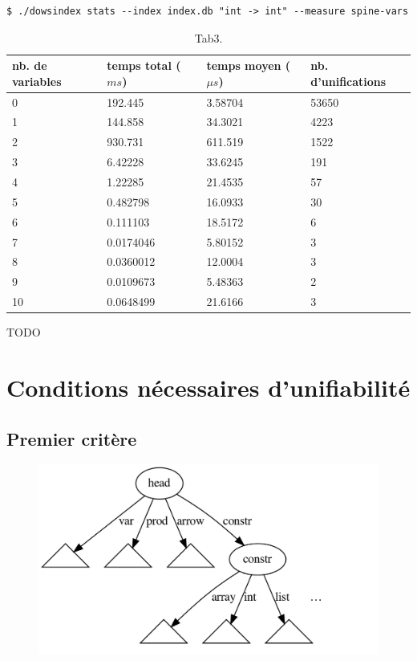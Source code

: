 \documentclass[a4paper]{report}
\theoremstyle{definition}
\begin{document}
\begin{verbatim}
$ ./dowsindex stats --index index.db "int -> int" --measure spine-vars
\end{verbatim}

\begin{table}[h]
	\centering
	\begin{tabular}{|l|l|l|l|}
		\hline
			nb. de variables &
			temps total ($ms$) &
			temps moyen ($\mu s$) &
			nb. d'unifications
		\\
		\hline
			0 & 192.445 & 3.58704 & 53650
		\\
			1 & 144.858 & 34.3021 & 4223
		\\
			2 & 930.731 & 611.519 & 1522
		\\
			3 & 6.42228 & 33.6245 & 191
		\\
			4 & 1.22285 & 21.4535 & 57
		\\
			5 & 0.482798 & 16.0933 & 30
		\\
			6 & 0.111103 & 18.5172 & 6
		\\
			7 & 0.0174046 & 5.80152 & 3
		\\
			8 & 0.0360012 & 12.0004 & 3
		\\
			9 & 0.0109673 & 5.48363 & 2
		\\
			10 & 0.0648499 & 21.6166 & 3
		\\
		\hline
	\end{tabular}
	\caption{\label{tab3} Tab3.}
\end{table}

TODO


\section{Conditions nécessaires d'unifiabilité}


\subsection{Premier critère}

\begin{figure}[h]
\begin{center}
	\includegraphics[scale=0.2]{graphs/by_head}
\end{center}
\end{figure}
\end{document}
